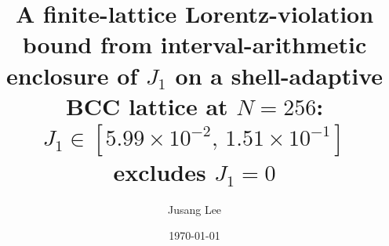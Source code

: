 



\title{A finite-lattice Lorentz-violation bound from interval-arithmetic
enclosure of $J_1$ on a shell-adaptive BCC lattice at $N=256$:
$J_1 \in [5.99 \times 10^{-2},\,1.51 \times 10^{-1}]$ excludes $J_1 = 0$}

\author{Jusang Lee}

\date{\today}

